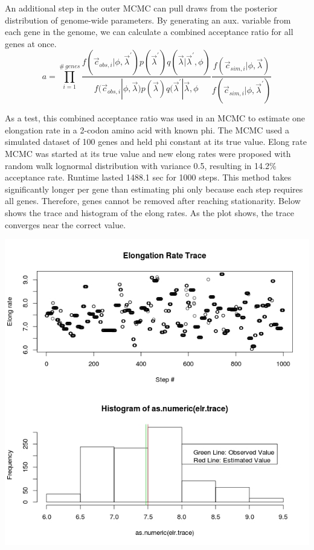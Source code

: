 \documentclass{article}
\begin{document}
 	An additional step in the outer MCMC can pull draws from the posterior distribution of genome-wide parameters. By generating an aux. variable from each gene in the genome, we can calculate a combined acceptance ratio for all genes at once. 
	\begin{equation}
	a = \displaystyle{\prod_{i=1}^{\#\,genes}\frac{f(\vec{c}_{obs,i}|\phi,\vec{\lambda}^\prime)p(\vec{\lambda}^\prime)q(\vec{\lambda}|\vec{\lambda}^\prime,\phi)}{f(\vec{c}_{obs,i}|\phi,\vec{\lambda})p(\vec{\lambda})q(\vec{\lambda}^\prime|\vec{\lambda},\phi}\frac{f(\vec{c}_{sim,i}|\phi,\vec{\lambda})}{f(\vec{c}_{sim,i}|\phi,\vec{\lambda}^\prime)}}
	\end{equation}	 	
	
 	As a test, this combined acceptance ratio was used in an MCMC to estimate one elongation rate in a 2-codon amino acid with known phi. The MCMC used a simulated dataset of 100 genes and held phi constant at its true value. Elong rate MCMC was started at its true value and new elong rates were proposed with random walk lognormal distribution with variance 0.5, resulting in 14.2\% acceptance rate. Runtime lasted 1488.1 sec for 1000 steps. This method takes significantly longer per gene than estimating phi only because each step requires all genes. Therefore, genes cannot be removed after reaching stationarity. Below shows the trace and histogram of the elong rates. As the plot shows, the trace converges near the correct value.
 	
 	\includegraphics[scale=0.5]{../chosen_100/genome_parms/elr_test/Rplot.jpeg}
 	
\end{document}
